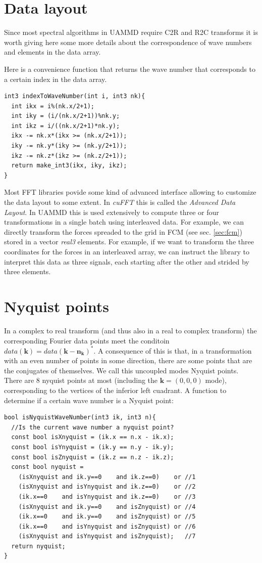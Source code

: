 \documentclass[ twoside,openright,titlepage,numbers=noenddot,%
headinclude,footinclude,cleardoublepage=empty,abstract=on,
BCOR=5mm,paper=a4,fontsize=11pt, dvipsnames
]{scrreprt}
\def\ucpp{uammd_cpp_lexer.py:UAMMDCppLexer -x}
\renewcommand{\vec}[1]{\bm{#1}}
\newcommand{\uammd}{\gls{UAMMD}\xspace}
\begin{document}
\section*{Data layout}
Since most spectral algorithms in \uammd require C2R and R2C transforms it is worth giving here some more details about the correspondence of wave numbers and elements in the data array.

Here is a convenience function that returns the wave number that corresponds to a certain index in the data array.
\begin{verbatim}
int3 indexToWaveNumber(int i, int3 nk){
  int ikx = i%(nk.x/2+1);
  int iky = (i/(nk.x/2+1))%nk.y;
  int ikz = i/((nk.x/2+1)*nk.y);
  ikx -= nk.x*(ikx >= (nk.x/2+1));
  iky -= nk.y*(iky >= (nk.y/2+1));
  ikz -= nk.z*(ikz >= (nk.z/2+1));
  return make_int3(ikx, iky, ikz);
}
\end{verbatim}

Most \gls{FFT} libraries povide some kind of advanced interface allowing to customize the data layout to some extent. In \emph{cuFFT} this is called the \emph{Advanced Data Layout}. In \uammd this is used extensively to compute three or four transformations in a single batch using interleaved data. For example, we can directly transform the forces spreaded to the grid in \gls{FCM} (see sec. \ref{sec:fcm}) stored in a vector \emph{real3} elements.
For example, if we want to transform the three coordinates for the forces in an interleaved array, we can instruct the library to interpret this data as three signals, each starting after the other and strided by three elements.
\section*{Nyquist points}
In a complex to real transform (and thus also in a real to complex transform) the corresponding Fourier data points meet the conditoin $data(\vec{k}) = data(\vec{k} - \vec{n_k})^*$. A consequence of this is that, in a transformation with an even number of points in some direction, there are some points that are the conjugates of themselves. We call this uncoupled modes Nyquist points.
There are $8$ nyquist points at most (including the $\vec{k} = (0,0,0)$ mode), corresponding to the vertices of the inferior left cuadrant.
A function to determine if a certain wave number is a Nyquist point:
\begin{verbatim}
bool isNyquistWaveNumber(int3 ik, int3 n){
  //Is the current wave number a nyquist point?
  const bool isXnyquist = (ik.x == n.x - ik.x);
  const bool isYnyquist = (ik.y == n.y - ik.y);
  const bool isZnyquist = (ik.z == n.z - ik.z);
  const bool nyquist =  
    (isXnyquist and ik.y==0    and ik.z==0)    or //1
    (isXnyquist and isYnyquist and ik.z==0)    or //2
    (ik.x==0    and isYnyquist and ik.z==0)    or //3
    (isXnyquist and ik.y==0    and isZnyquist) or //4
    (ik.x==0    and ik.y==0    and isZnyquist) or //5
    (ik.x==0    and isYnyquist and isZnyquist) or //6
    (isXnyquist and isYnyquist and isZnyquist);   //7
  return nyquist;
}
\end{verbatim}
\end{document}
